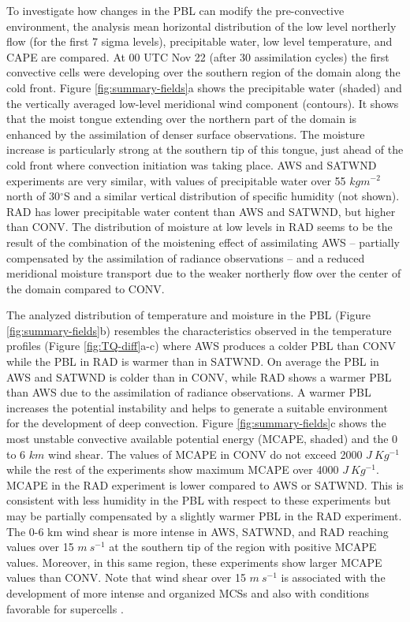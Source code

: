 \documentclass[final,5p,times,twocolumn,authoryear]{elsarticle} %
\begin{document}
To investigate how changes in the PBL can modify the pre-convective environment, the analysis mean horizontal distribution of the low level northerly flow (for the first 7 sigma levels), precipitable water, low level temperature, and CAPE are compared. At 00 UTC Nov 22 (after 30 assimilation cycles) the first convective cells were developing over the southern region of the domain along the cold front. Figure \ref{fig:summary-fields}a shows the precipitable water (shaded) and the vertically averaged low-level meridional wind component (contours). It shows that the moist tongue extending over the northern part of the domain is enhanced by the assimilation of denser surface observations. The moisture increase is particularly strong at the southern tip of this tongue, just ahead of the cold front where convection initiation was taking place. AWS and SATWND experiments are very similar, with values of precipitable water over 55 \(kgm^{-2}\) north of 30\(^{\circ}\)S and a similar vertical distribution of specific humidity (not shown). RAD has lower precipitable water content than AWS and SATWND, but higher than CONV. The distribution of moisture at low levels in RAD seems to be the result of the combination of the moistening effect of assimilating AWS -- partially compensated by the assimilation of radiance observations -- and a reduced meridional moisture transport due to the weaker northerly flow over the center of the domain compared to CONV.

The analyzed distribution of temperature and moisture in the PBL (Figure \ref{fig:summary-fields}b) resembles the characteristics observed in the temperature profiles (Figure \ref{fig:TQ-diff}a-c) where AWS produces a colder PBL than CONV while the PBL in RAD is warmer than in SATWND. On average the PBL in AWS and SATWND is colder than in CONV, while RAD shows a warmer PBL than AWS due to the assimilation of radiance observations. A warmer PBL increases the potential instability and helps to generate a suitable environment for the development of deep convection. Figure \ref{fig:summary-fields}c shows the most unstable convective available potential energy (MCAPE, shaded) and the 0 to 6 \(km\) wind shear. The values of MCAPE in CONV do not exceed 2000 \(J\ Kg^{-1}\) while the rest of the experiments show maximum MCAPE over 4000 \(J\ Kg^{-1}\). MCAPE in the RAD experiment is lower compared to AWS or SATWND. This is consistent with less humidity in the PBL with respect to these experiments but may be partially compensated by a slightly warmer PBL in the RAD experiment. The 0-6 km wind shear is more intense in AWS, SATWND, and RAD reaching values over 15 \(m\ s^{-1}\) at the southern tip of the region with positive MCAPE values. Moreover, in this same region, these experiments show larger MCAPE values than CONV. Note that wind shear over 15 \(m\ s^{-1}\) is associated with the development of more intense and organized MCSs \citep{chen2015} and also with conditions favorable for supercells \citep{markowski2010}.
\end{document}

